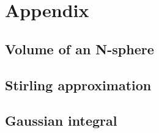 \appendix
\part{Appendix}
\chapter{Volume of an N-sphere}
\chapter{Stirling approximation}
\chapter{Gaussian integral}

